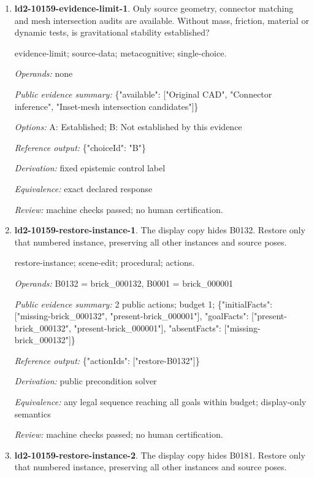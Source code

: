 \begin{enumerate}
\item \textbf{ld2-10159-evidence-limit-1}. Only source geometry, connector matching and mesh intersection audits are available. Without mass, friction, material or dynamic tests, is gravitational stability established?
\par{\small evidence-limit; source-data; metacognitive; single-choice.\par\textit{Operands:} none\par\textit{Public evidence summary:} \{"available": ["Original CAD", "Connector inference", "Inset-mesh intersection candidates"]\}\par\textit{Options:} A: Established; B: Not established by this evidence\par\textit{Reference output:} \{"choiceId": "B"\}\par\textit{Derivation:} fixed epistemic control label\par\textit{Equivalence:} exact declared response\par\textit{Review:} machine checks passed; no human certification.}
\item \textbf{ld2-10159-restore-instance-1}. The display copy hides B0132. Restore only that numbered instance, preserving all other instances and source poses.
\par{\small restore-instance; scene-edit; procedural; actions.\par\textit{Operands:} B0132 = brick\_000132, B0001 = brick\_000001\par\textit{Public evidence summary:} 2 public actions; budget 1; \{"initialFacts": ["missing-brick\_000132", "present-brick\_000001"], "goalFacts": ["present-brick\_000132", "present-brick\_000001"], "absentFacts": ["missing-brick\_000132"]\}\par\textit{Reference output:} \{"actionIds": ["restore-B0132"]\}\par\textit{Derivation:} public precondition solver\par\textit{Equivalence:} any legal sequence reaching all goals within budget; display-only semantics\par\textit{Review:} machine checks passed; no human certification.}
\item \textbf{ld2-10159-restore-instance-2}. The display copy hides B0181. Restore only that numbered instance, preserving all other instances and source poses.

\end{enumerate}
